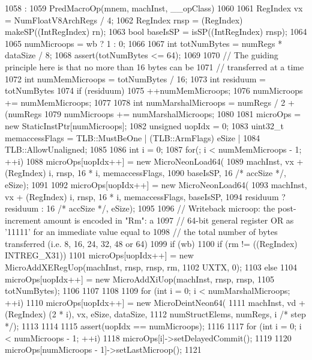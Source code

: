 \begin{DoxyCode}
1058                                                                            :
1059     PredMacroOp(mnem, machInst, __opClass)
1060 {
1061     RegIndex vx = NumFloatV8ArchRegs / 4;
1062     RegIndex rnsp = (RegIndex) makeSP((IntRegIndex) rn);
1063     bool baseIsSP = isSP((IntRegIndex) rnsp);
1064 
1065     numMicroops = wb ? 1 : 0;
1066 
1067     int totNumBytes = numRegs * dataSize / 8;
1068     assert(totNumBytes <= 64);
1069 
1070     // The guiding principle here is that no more than 16 bytes can be
1071     // transferred at a time
1072     int numMemMicroops = totNumBytes / 16;
1073     int residuum = totNumBytes %
1074     if (residuum)
1075         ++numMemMicroops;
1076     numMicroops += numMemMicroops;
1077 
1078     int numMarshalMicroops = numRegs / 2 + (numRegs %
1079     numMicroops += numMarshalMicroops;
1080 
1081     microOps = new StaticInstPtr[numMicroops];
1082     unsigned uopIdx = 0;
1083     uint32_t memaccessFlags = TLB::MustBeOne | (TLB::ArmFlags) eSize |
1084         TLB::AllowUnaligned;
1085 
1086     int i = 0;
1087     for(; i < numMemMicroops - 1; ++i) {
1088         microOps[uopIdx++] = new MicroNeonLoad64(
1089             machInst, vx + (RegIndex) i, rnsp, 16 * i, memaccessFlags,
1090             baseIsSP, 16 /* accSize */, eSize);
1091     }
1092     microOps[uopIdx++] =  new MicroNeonLoad64(
1093         machInst, vx + (RegIndex) i, rnsp, 16 * i, memaccessFlags, baseIsSP,
1094         residuum ? residuum : 16 /* accSize */, eSize);
1095 
1096     // Writeback microop: the post-increment amount is encoded in "Rm": a
1097     // 64-bit general register OR as '11111' for an immediate value equal to
1098     // the total number of bytes transferred (i.e. 8, 16, 24, 32, 48 or 64)
1099     if (wb) {
1100         if (rm != ((RegIndex) INTREG_X31)) {
1101             microOps[uopIdx++] = new MicroAddXERegUop(machInst, rnsp, rnsp, rm,
1102                                                       UXTX, 0);
1103         } else {
1104             microOps[uopIdx++] = new MicroAddXiUop(machInst, rnsp, rnsp,
1105                                                    totNumBytes);
1106         }
1107     }
1108 
1109     for (int i = 0; i < numMarshalMicroops; ++i) {
1110         microOps[uopIdx++] = new MicroDeintNeon64(
1111             machInst, vd + (RegIndex) (2 * i), vx, eSize, dataSize,
1112             numStructElems, numRegs, i /* step */);
1113     }
1114 
1115     assert(uopIdx == numMicroops);
1116 
1117     for (int i = 0; i < numMicroops - 1; ++i) {
1118         microOps[i]->setDelayedCommit();
1119     }
1120     microOps[numMicroops - 1]->setLastMicroop();
1121 }

\end{DoxyCode}


